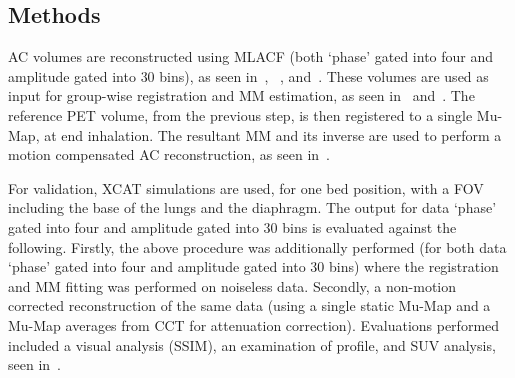         \subsection{Methods} \label{sec:pet_ct_motion_correction_exploiting_motion_models_fit_on_coarsely_gated_data_applied_to_finely_gated_data_methods}
            \gls{AC} volumes are reconstructed using \gls{MLACF} (both `phase' gated into four and amplitude gated into $30$ bins), as seen in~, ~, and~. These volumes are used as input for group-wise registration and \gls{MM} estimation, as seen in~ and~. The reference \gls{PET} volume, from the previous step, is then registered to a single \gls{Mu-Map}, at end inhalation. The resultant \gls{MM} and its inverse are used to perform a motion compensated \gls{AC} reconstruction, as seen in~.
            
            For validation, \gls{XCAT} simulations are used, for one bed position, with a \gls{FOV} including the base of the lungs and the diaphragm. The output for data `phase' gated into four and amplitude gated into $30$ bins is evaluated against the following. Firstly, the above procedure was additionally performed (for both data `phase' gated into four and amplitude gated into $30$ bins) where the registration and \gls{MM} fitting was performed on noiseless data. Secondly, a non-motion corrected reconstruction of the same data (using a single static \gls{Mu-Map} and a \gls{Mu-Map} averages from \gls{CCT} for attenuation correction). Evaluations performed included a visual analysis (\gls{SSIM}), an examination of profile, and \gls{SUV} analysis, seen in~.
            
